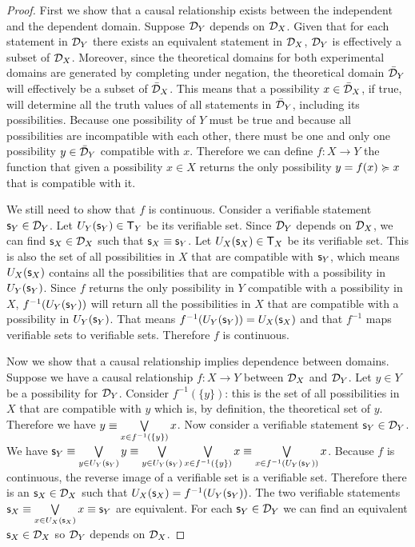 \documentclass[11pt,letterpaper,fleqn]{memoir} %
\begin{document}
\begin{mathSection}
\begin{thrm}
	\end{thrm}
	\begin{proof}
		First we show that a causal relationship exists between the independent and the dependent domain. Suppose $\mathcal{D}_Y$ depends on $\mathcal{D}_X$. Given that for each statement in $\mathcal{D}_Y$ there exists an equivalent statement in $\mathcal{D}_X$, $\mathcal{D}_Y$ is effectively a subset of $\mathcal{D}_X$. Moreover, since the theoretical domains for both experimental domains are generated by completing under negation, the theoretical domain $\bar{\mathcal{D}}_Y$ will effectively be a subset of $\bar{\mathcal{D}}_X$. This means that a possibility $x \in \bar{\mathcal{D}}_X$, if true, will determine all the truth values of  all statements in $\bar{\mathcal{D}}_Y$, including its possibilities. Because one possibility of $Y$ must be true and because all possibilities are incompatible with each other, there must be one and only one possibility $y \in \bar{\mathcal{D}}_Y$ compatible with $x$. Therefore we can define $f : X \to Y$ the function that given a possibility $x \in X$ returns the only possibility $y=f(x) \succcurlyeq x$ that is compatible with it.
		
		We still need to show that $f$ is continuous. Consider a verifiable statement $\mathsf{s}_Y \in \mathcal{D}_Y$. Let $U_Y(\mathsf{s}_Y) \in \mathsf{T}_Y$ be its verifiable set. Since $\mathcal{D}_Y$ depends on $\mathcal{D}_X$, we can find $\mathsf{s}_X \in \mathcal{D}_X$ such that $\mathsf{s}_X \equiv \mathsf{s}_Y$. Let $U_X(\mathsf{s}_X) \in \mathsf{T}_X$ be its verifiable set. This is also the set of all possibilities in $X$ that are compatible with $\mathsf{s}_Y$, which means $U_X(\mathsf{s}_X)$ contains all the possibilities that are compatible with a possibility in $U_Y(\mathsf{s}_Y)$. Since $f$ returns the only possibility in $Y$ compatible with a possibility in $X$, $f^{-1}(U_Y(\mathsf{s}_Y))$ will return all the possibilities in $X$ that are compatible with a possibility in $U_Y(\mathsf{s}_Y)$. That means $f^{-1}(U_Y(\mathsf{s}_Y)) = U_X(\mathsf{s}_X)$ and that $f^{-1}$ maps verifiable sets to verifiable sets. Therefore $f$ is continuous.
		
		Now we show that a causal relationship implies dependence between domains. Suppose we have a causal relationship $f: X \to Y$ between $\mathcal{D}_X$ and $\mathcal{D}_Y$. Let $y \in Y$ be a possibility for $\mathcal{D}_Y$. Consider  $f^{-1}(\{y\})$: this is the set of all possibilities in $X$ that are compatible with $y$ which is, by definition, the theoretical set of $y$. Therefore we have $y \equiv \bigvee\limits_{x \in f^{-1}(\{y\})} x$. Now consider a verifiable statement $\mathsf{s}_Y \in \mathcal{D}_Y$. We have $\mathsf{s}_Y \equiv \bigvee\limits_{y \in U_Y(\mathsf{s}_Y)} y \equiv \bigvee\limits_{y \in U_Y(\mathsf{s}_Y)} \bigvee\limits_{x \in f^{-1}(\{y\})} x \equiv \bigvee\limits_{x \in f^{-1}(U_Y(\mathsf{s}_Y))} x$. Because $f$ is continuous, the reverse image of a verifiable set is a verifiable set. Therefore there is an $\mathsf{s}_X \in \mathcal{D}_X$ such that $U_X(\mathsf{s}_X) = f^{-1}(U_Y(\mathsf{s}_Y))$. The two verifiable statements $\mathsf{s}_X \equiv \bigvee\limits_{x \in U_X(\mathsf{s}_X)} x \equiv \mathsf{s}_Y$ are equivalent. For each $\mathsf{s}_Y \in \mathcal{D}_Y$ we can find an equivalent $\mathsf{s}_X \in \mathcal{D}_X$ so $\mathcal{D}_Y$ depends on $\mathcal{D}_X$.
	\end{proof}


\end{mathSection}
\end{document}
